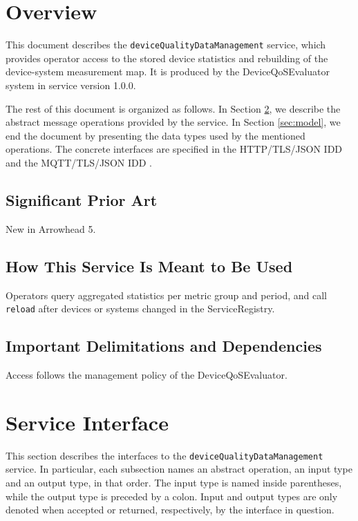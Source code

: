 \documentclass[a4paper]{arrowhead}
\begin{document}
\section{Overview}
\label{sec:overview}

This document describes the \texttt{device\allowbreak{}Quality\allowbreak{}Data\allowbreak{}Management} service, which provides operator access to the stored device statistics and rebuilding of the device-system measurement map.
It is produced by the DeviceQoSEvaluator system \cite{dqe-sysd} in service version 1.0.0.

The rest of this document is organized as follows.
In Section \ref{sec:operations}, we describe the abstract message operations provided by the service.
In Section \ref{sec:model}, we end the document by presenting the data types used by the mentioned operations.
The concrete interfaces are specified in the HTTP/TLS/JSON IDD \cite{dqe-deviceQualityDataManagement-http-idd} and the MQTT/TLS/JSON IDD \cite{dqe-deviceQualityDataManagement-mqtt-idd}.

\subsection{Significant Prior Art}

New in Arrowhead 5.

\subsection{How This Service Is Meant to Be Used}

Operators query aggregated statistics per metric group and period, and call \texttt{reload} after devices or systems changed in the ServiceRegistry.

\subsection{Important Delimitations and Dependencies}
\label{sec:delimitations}

Access follows the management policy of the Device\allowbreak{}Qo\allowbreak{}SEvaluator.

\newpage

\section{Service Interface}
\label{sec:operations}

This section describes the interfaces to the \texttt{device\allowbreak{}Quality\allowbreak{}Data\allowbreak{}Management} service.
In particular, each subsection names an abstract operation, an input type and an output type, in that order.
The input type is named inside parentheses, while the output type is preceded by a colon.
Input and output types are only denoted when accepted or returned, respectively, by the interface in question.
\end{document}

